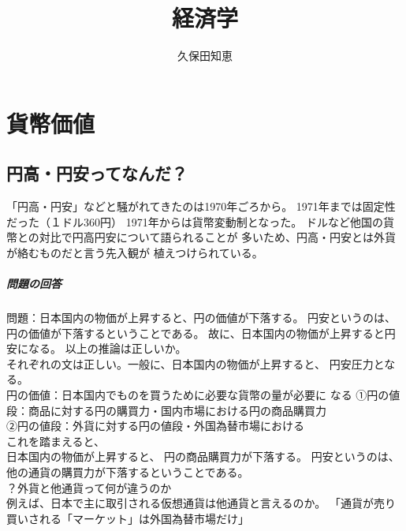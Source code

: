 \documentclass{jsarticle}
\begin{document}
\title{経済学}
\author{久保田知恵}
\maketitle

\section{貨幣価値}
\subsection{円高・円安ってなんだ？}
「円高・円安」などと騒がれてきたのは1970年ごろから。
1971年までは固定性だった（１ドル360円）
1971年からは貨幣変動制となった。
ドルなど他国の貨幣との対比で円高円安について語られることが
多いため、円高・円安とは外貨が絡むものだと言う先入観が
植えつけられている。\\
\subparagraph{問題の回答}
問題：日本国内の物価が上昇すると、円の価値が下落する。
円安というのは、円の価値が下落するということである。
故に、日本国内の物価が上昇すると円安になる。
以上の推論は正しいか。\\
それぞれの文は正しい。一般に、日本国内の物価が上昇すると、
円安圧力となる。\\
円の価値：日本国内でものを買うために必要な貨幣の量が必要に
なる
①円の値段：商品に対する円の購買力・国内市場における円の商品購買力\\
②円の値段：外貨に対する円の値段・外国為替市場における\\
これを踏まえると、\\
日本国内の物価が上昇すると、
円の商品購買力が下落する。
円安というのは、他の通貨の購買力が下落するということである。\\



？外貨と他通貨って何が違うのか\\
例えば、日本で主に取引される仮想通貨は他通貨と言えるのか。
「通貨が売り買いされる「マーケット」は外国為替市場だけ」






\section{}
\section{}
\section{}
\end{document}
